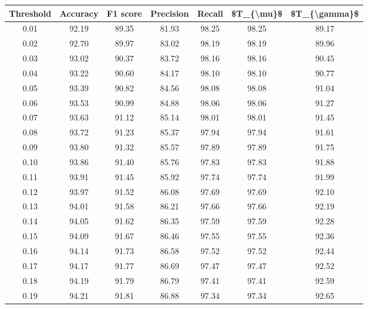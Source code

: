 \begin{tabular}{|c|c|c|c|c|c|c|}
\hline
 Threshold &  Accuracy &  F1 score &  Precision &  Recall &  \$T\_\{\textbackslash mu\}\$ &  \$T\_\{\textbackslash gamma\}\$ \\
\hline
      0.01 &     92.19 &     89.35 &      81.93 &   98.25 &      98.25 &         89.17 \\
      0.02 &     92.70 &     89.97 &      83.02 &   98.19 &      98.19 &         89.96 \\
      0.03 &     93.02 &     90.37 &      83.72 &   98.16 &      98.16 &         90.45 \\
      0.04 &     93.22 &     90.60 &      84.17 &   98.10 &      98.10 &         90.77 \\
      0.05 &     93.39 &     90.82 &      84.56 &   98.08 &      98.08 &         91.04 \\
      0.06 &     93.53 &     90.99 &      84.88 &   98.06 &      98.06 &         91.27 \\
      0.07 &     93.63 &     91.12 &      85.14 &   98.01 &      98.01 &         91.45 \\
      0.08 &     93.72 &     91.23 &      85.37 &   97.94 &      97.94 &         91.61 \\
      0.09 &     93.80 &     91.32 &      85.57 &   97.89 &      97.89 &         91.75 \\
      0.10 &     93.86 &     91.40 &      85.76 &   97.83 &      97.83 &         91.88 \\
      0.11 &     93.91 &     91.45 &      85.92 &   97.74 &      97.74 &         91.99 \\
      0.12 &     93.97 &     91.52 &      86.08 &   97.69 &      97.69 &         92.10 \\
      0.13 &     94.01 &     91.58 &      86.21 &   97.66 &      97.66 &         92.19 \\
      0.14 &     94.05 &     91.62 &      86.35 &   97.59 &      97.59 &         92.28 \\
      0.15 &     94.09 &     91.67 &      86.46 &   97.55 &      97.55 &         92.36 \\
      0.16 &     94.14 &     91.73 &      86.58 &   97.52 &      97.52 &         92.44 \\
      0.17 &     94.17 &     91.77 &      86.69 &   97.47 &      97.47 &         92.52 \\
      0.18 &     94.19 &     91.79 &      86.79 &   97.41 &      97.41 &         92.59 \\
      0.19 &     94.21 &     91.81 &      86.88 &   97.34 &      97.34 &         92.65 \\

\end{tabular}
